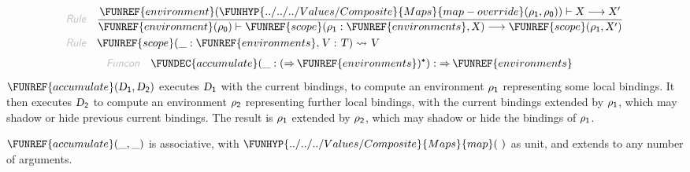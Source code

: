 \begin{align*}
  \KEY{Rule} \quad
    & \frac{
      \FUNREF{environment} (  \FUNHYP{../../../Values/Composite}{Maps}{map-override}
                                  (  \VAR{\ensuremath{\rho}}\SUB{1}, 
                                         \VAR{\ensuremath{\rho}}\SUB{0} ) ) \vdash \VAR{X} \TRANS 
        \VAR{X}'
      }{
      \FUNREF{environment} (  \VAR{\ensuremath{\rho}}\SUB{0} ) \vdash \FUNREF{scope}
                    (  \VAR{\ensuremath{\rho}}\SUB{1} : \FUNREF{environments}, 
                           \VAR{X} ) \TRANS 
        \FUNREF{scope}
          (  \VAR{\ensuremath{\rho}}\SUB{1}, 
                 \VAR{X}' )
      }
\\
  \KEY{Rule} \quad
    & \FUNREF{scope}
        (  \_ : \FUNREF{environments}, 
               \VAR{V} : \VAR{T} ) \leadsto 
        \VAR{V}
\end{align*}
\begin{align*}
  \KEY{Funcon} \quad
  & \FUNDEC{accumulate}(
                     \_ : (   \TO \FUNREF{environments} )\STAR) 
    :  \TO \FUNREF{environments} 
\end{align*}
$\FUNREF{accumulate}
    (  \VAR{D}\SUB{1}, 
           \VAR{D}\SUB{2} )$ executes $\VAR{D}\SUB{1}$ with the current bindings, to compute an
  environment $\VAR{\ensuremath{\rho}}\SUB{1}$ representing some local bindings. It then executes $\VAR{D}\SUB{2}$ to
  compute an environment $\VAR{\ensuremath{\rho}}\SUB{2}$ representing further local bindings, with the
  current bindings extended by $\VAR{\ensuremath{\rho}}\SUB{1}$, which may shadow or hide previous
  current bindings. The result is $\VAR{\ensuremath{\rho}}\SUB{1}$ extended by $\VAR{\ensuremath{\rho}}\SUB{2}$, which may shadow
  or hide the bindings of $\VAR{\ensuremath{\rho}}\SUB{1}$.

$\FUNREF{accumulate}
    (  \_, 
           \_ )$ is associative, with $\FUNHYP{../../../Values/Composite}{Maps}{map}
    (   \  )$ as unit, and extends to any
  number of arguments.

